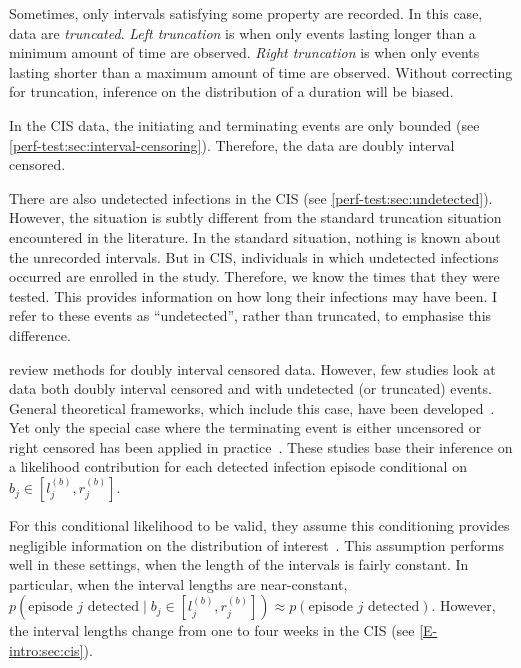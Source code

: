 \documentclass[thesis.tex]{subfiles}
\begin{document}
Sometimes, only intervals satisfying some property are recorded.
In this case, data are \emph{truncated}.
\emph{Left truncation} is when only events lasting longer than a minimum amount of time are observed.
\emph{Right truncation} is when only events lasting shorter than a maximum amount of time are observed.
Without correcting for truncation, inference on the distribution of a duration will be biased.

In the CIS data, the initiating and terminating events are only bounded (see \cref{perf-test:sec:interval-censoring}).
Therefore, the data are doubly interval censored.

There are also undetected infections in the CIS (see \cref{perf-test:sec:undetected}).
However, the situation is subtly different from the standard truncation situation encountered in the literature.
In the standard situation, nothing is known about the unrecorded intervals.
But in CIS, individuals in which undetected infections occurred are enrolled in the study.
Therefore, we know the times that they were tested.
This provides information on how long their infections may have been.
I refer to these events as ``undetected'', rather than truncated, to emphasise this difference.

\Textcite{sunAnalysis,bogaertsSurvival} review methods for doubly interval censored data.
However, few studies look at data both doubly interval censored and with undetected (or truncated) events.
General theoretical frameworks, which include this case, have been developed~\autocite{turnbullEmpirical,dempsterMaximum}.
Yet only the special case where the terminating event is either uncensored or right censored has been applied in practice~\autocite[e.g.][]{sunEmpirical,bacchettiNonparametric,shenNonparametric}.
These studies base their inference on a likelihood contribution for each detected infection episode conditional on $b_j \in [l_j^{(b)}, r_j^{(b)}]$.

For this conditional likelihood to be valid, they assume this conditioning provides negligible information on the distribution of interest~.
This assumption performs well in these settings, when the length of the intervals is fairly constant.
In particular, when the interval lengths are near-constant, $p(\text{episode $j$ detected} \mid b_j \in [l_j^{(b)}, r_j^{(b)}]) \approx p(\text{episode $j$ detected})$.
However, the interval lengths change from one to four weeks in the CIS (see \cref{E-intro:sec:cis}).
\end{document}
